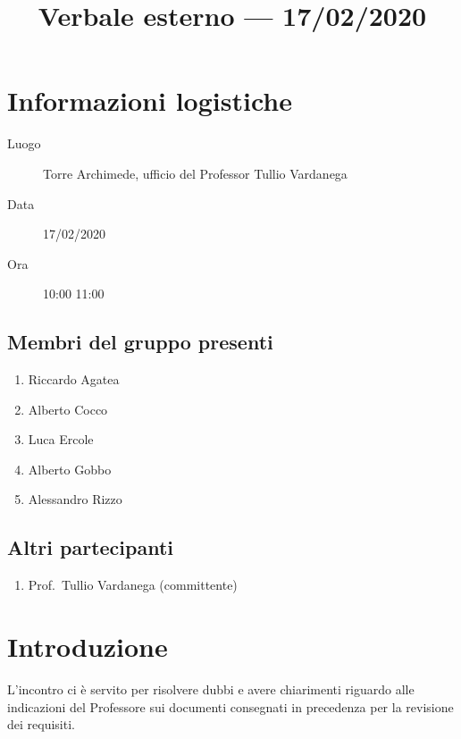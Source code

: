 \documentclass{article}
\title{Verbale esterno --- 17/02/2020}
\begin{document}


\section{Informazioni logistiche}%
\label{sec:informazioni_logistiche}

\begin{description}
  \item [Luogo] Torre Archimede, ufficio del Professor Tullio Vardanega
  \item [Data] 17/02/2020
  \item [Ora] 10:00  11:00
\end{description}

\subsection{Membri del gruppo presenti}%
\label{sub:membri_del_gruppo_presenti}

\begin{enumerate}
  \item Riccardo Agatea
  \item Alberto Cocco
  \item Luca Ercole
  \item Alberto Gobbo
  \item Alessandro Rizzo
\end{enumerate}

\subsection{Altri partecipanti}%
\label{sub:altri_partecipanti}
\begin{enumerate}
  \item Prof.\ Tullio Vardanega (committente)
\end{enumerate}


\section{Introduzione}%
\label{sec:introduzione}

L'incontro ci è servito per risolvere dubbi e avere chiarimenti riguardo alle indicazioni del Professore sui documenti consegnati in precedenza per la revisione dei requisiti. 
\end{document}
